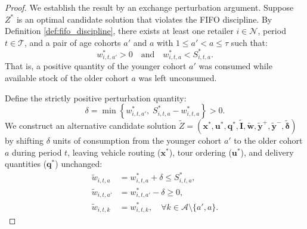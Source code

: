 \documentclass[11pt,a4paper]{article}
\theoremstyle{definition}
\theoremstyle{remark}
\begin{document}
\begin{proof}
We establish the result by an exchange perturbation argument. Suppose $Z^*$ is an optimal candidate solution that violates the FIFO discipline. By Definition \ref{def:fifo_discipline}, there exists at least one retailer $i \in \mathcal{N}$, period $t \in \mathcal{T}$, and a pair of age cohorts $a'$ and $a$ with $1 \le a' < a \le \tau$ such that:
\begin{equation*}
    w_{i,t,a'}^* > 0 \quad \text{and} \quad w_{i,t,a}^* < S_{i,t,a}^*.
\end{equation*}
That is, a positive quantity of the younger cohort $a'$ was consumed while available stock of the older cohort $a$ was left unconsumed.

Define the strictly positive perturbation quantity:
\begin{equation*}
    \delta = \min \left\{ w_{i,t,a'}^*, \; S_{i,t,a}^* - w_{i,t,a}^* \right\} > 0.
\end{equation*}
We construct an alternative candidate solution $\tilde{Z} = (\mathbf{x}^*, \mathbf{u}^*, \mathbf{q}^*, \tilde{\mathbf{I}}, \tilde{\mathbf{w}}, \tilde{\mathbf{y}}^+, \tilde{\mathbf{y}}^-, \tilde{\boldsymbol{\delta}})$ by shifting $\delta$ units of consumption from the younger cohort $a'$ to the older cohort $a$ during period $t$, leaving vehicle routing ($\mathbf{x}^*$), tour ordering ($\mathbf{u}^*$), and delivery quantities ($\mathbf{q}^*$) unchanged:
\begin{align*}
    \tilde{w}_{i,t,a} &= w_{i,t,a}^* + \delta \le S_{i,t,a}^*, \\
    \tilde{w}_{i,t,a'} &= w_{i,t,a'}^* - \delta \ge 0, \\
    \tilde{w}_{i,t,k} &= w_{i,t,k}^*, \quad \forall k \in \mathcal{A} \setminus \{a', a\}.
\end{align*}


\end{proof}
\end{document}
